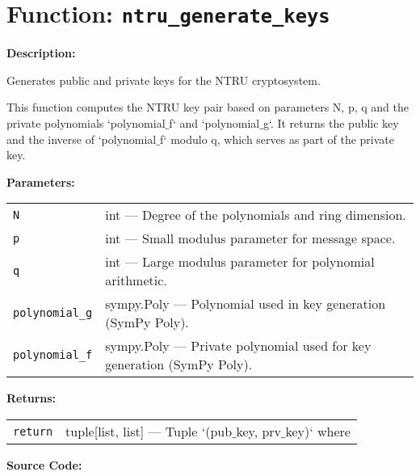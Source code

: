 \documentclass[a4paper,12pt]{article}
\begin{document}
\section*{Function: \texttt{ntru\_generate\_keys}}

\textbf{Description:}

Generates public and private keys for the NTRU cryptosystem.

This function computes the NTRU key pair based on parameters N, p, q and the
private polynomials `polynomial$\_$f` and `polynomial$\_$g`. It returns the public key
and the inverse of `polynomial$\_$f` modulo q, which serves as part of the private key.

\vspace{1em}
\textbf{Parameters:}

\vspace{1em}
\noindent
\begin{tabular}{p{3cm} p{11cm}}
\texttt{N} & int — Degree of the polynomials and ring dimension. \\
\texttt{p} & int — Small modulus parameter for message space. \\
\texttt{q} & int — Large modulus parameter for polynomial arithmetic. \\
\texttt{polynomial\_g} & sympy.Poly — Polynomial used in key generation (SymPy Poly). \\
\texttt{polynomial\_f} & sympy.Poly — Private polynomial used for key generation (SymPy Poly). \\
\end{tabular}

\vspace{1em}
\noindent
\textbf{Returns:}

\begin{tabular}{p{3cm} p{11cm}}
\texttt{return} & tuple[list, list] — Tuple `(pub$\_$key, prv$\_$key)` where \\
\end{tabular}

\vspace{1em}
\textbf{Source Code:}
\end{document}

